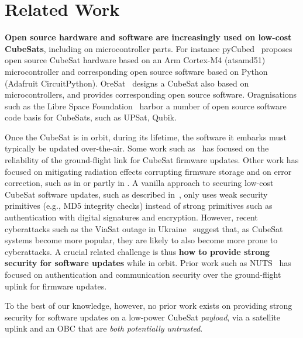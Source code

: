 \section{Related Work}
\label{sec:background-related-work}


{\bf Open source hardware and software are increasingly used on low-cost CubeSats}, including on microcontroller parts.
For instance pyCubed~\cite{Holliday2019PyCubed} proposes open source CubeSat hardware based on an Arm Cortex-M4 (atsamd51) microcontroller and corresponding open source software based on Python (Adafruit CircuitPython).
OreSat~\cite{spivey2021oresat} designs a CubeSat also based on microcontrollers, and provides corresponding open source software.
Oragnisations such as the Libre Space Foundation~\cite{librespace} harbor a number of open source software code basis for CubeSats, such as UPSat, Qubik. 

Once the CubeSat is in orbit, during its lifetime, the software it embarks must typically be updated over-the-air.
Some work such as~\cite{FitzsimmonsReliableSoftwareUpdates} has focused on the reliability of the ground-flight link for CubeSat firmware updates.
Other work has focused on mitigating radiation effects corrupting firmware storage and on error correction, such as in \cite{yuen2019low} or partly in \cite{sunter2016updatesnano}.
A vanilla approach to securing low-cost CubeSat software updates, such as described in~\cite{maison2021otaeducubesat}, only uses weak security primitives (e.g., MD5 integrity checks) instead of strong primitives such as authentication with digital signatures and encryption.
However, recent cyberattacks such as the ViaSat outage in Ukraine~\cite{viasat-cyberattack} suggest that, as CubeSat systems become more popular, they are likely to also become more prone to cyberattacks.
A crucial related challenge is thus {\bf how to provide strong security for software updates} while in orbit.
Prior work such as NUTS~\cite{birkeland2014nutsoverview,bezem2013nutsAuthenticatedUplink} has focused on authentication and communication security over the ground-flight uplink for firmware updates.

To the best of our knowledge, however, no prior work exists on providing strong security for software updates on a low-power CubeSat \textit{payload}, via a satellite uplink and an OBC that are \textit{both potentially untrusted}.


\iffalse

